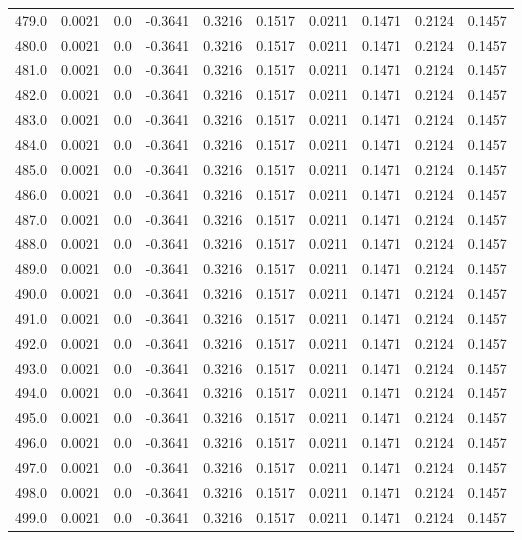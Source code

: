 \begin{longtable}{lrrrrrrrrr}
479.0 & 0.0021 & 0.0 & -0.3641 & 0.3216 & 0.1517 & 0.0211 & 0.1471 & 0.2124 & 0.1457 \\
480.0 & 0.0021 & 0.0 & -0.3641 & 0.3216 & 0.1517 & 0.0211 & 0.1471 & 0.2124 & 0.1457 \\
481.0 & 0.0021 & 0.0 & -0.3641 & 0.3216 & 0.1517 & 0.0211 & 0.1471 & 0.2124 & 0.1457 \\
482.0 & 0.0021 & 0.0 & -0.3641 & 0.3216 & 0.1517 & 0.0211 & 0.1471 & 0.2124 & 0.1457 \\
483.0 & 0.0021 & 0.0 & -0.3641 & 0.3216 & 0.1517 & 0.0211 & 0.1471 & 0.2124 & 0.1457 \\
484.0 & 0.0021 & 0.0 & -0.3641 & 0.3216 & 0.1517 & 0.0211 & 0.1471 & 0.2124 & 0.1457 \\
485.0 & 0.0021 & 0.0 & -0.3641 & 0.3216 & 0.1517 & 0.0211 & 0.1471 & 0.2124 & 0.1457 \\
486.0 & 0.0021 & 0.0 & -0.3641 & 0.3216 & 0.1517 & 0.0211 & 0.1471 & 0.2124 & 0.1457 \\
487.0 & 0.0021 & 0.0 & -0.3641 & 0.3216 & 0.1517 & 0.0211 & 0.1471 & 0.2124 & 0.1457 \\
488.0 & 0.0021 & 0.0 & -0.3641 & 0.3216 & 0.1517 & 0.0211 & 0.1471 & 0.2124 & 0.1457 \\
489.0 & 0.0021 & 0.0 & -0.3641 & 0.3216 & 0.1517 & 0.0211 & 0.1471 & 0.2124 & 0.1457 \\
490.0 & 0.0021 & 0.0 & -0.3641 & 0.3216 & 0.1517 & 0.0211 & 0.1471 & 0.2124 & 0.1457 \\
491.0 & 0.0021 & 0.0 & -0.3641 & 0.3216 & 0.1517 & 0.0211 & 0.1471 & 0.2124 & 0.1457 \\
492.0 & 0.0021 & 0.0 & -0.3641 & 0.3216 & 0.1517 & 0.0211 & 0.1471 & 0.2124 & 0.1457 \\
493.0 & 0.0021 & 0.0 & -0.3641 & 0.3216 & 0.1517 & 0.0211 & 0.1471 & 0.2124 & 0.1457 \\
494.0 & 0.0021 & 0.0 & -0.3641 & 0.3216 & 0.1517 & 0.0211 & 0.1471 & 0.2124 & 0.1457 \\
495.0 & 0.0021 & 0.0 & -0.3641 & 0.3216 & 0.1517 & 0.0211 & 0.1471 & 0.2124 & 0.1457 \\
496.0 & 0.0021 & 0.0 & -0.3641 & 0.3216 & 0.1517 & 0.0211 & 0.1471 & 0.2124 & 0.1457 \\
497.0 & 0.0021 & 0.0 & -0.3641 & 0.3216 & 0.1517 & 0.0211 & 0.1471 & 0.2124 & 0.1457 \\
498.0 & 0.0021 & 0.0 & -0.3641 & 0.3216 & 0.1517 & 0.0211 & 0.1471 & 0.2124 & 0.1457 \\
499.0 & 0.0021 & 0.0 & -0.3641 & 0.3216 & 0.1517 & 0.0211 & 0.1471 & 0.2124 & 0.1457 \\

\end{longtable}
